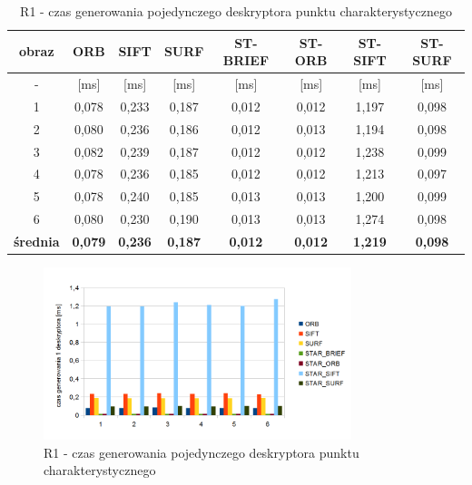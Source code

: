 \begin{table}[!htbp]
  \centering
  \caption{R1 - czas generowania pojedynczego deskryptora punktu charakterystycznego}
    \begin{tabular}{|c|c|c|c|c|c|c|c|}\hline

    obraz & \textbf{ORB} & \textbf{SIFT} & \textbf{SURF} & \textbf{ST-BRIEF} & \textbf{ST-ORB} & \textbf{ST-SIFT} & \textbf{ST-SURF} \\\hline

    - & [ms] & [ms] & [ms] & [ms] & [ms] & [ms] & [ms] \\\hline
    1 & 0,078 & 0,233 & 0,187 & 0,012 & 0,012 & 1,197 & 0,098 \\
    2 & 0,080 & 0,236 & 0,186 & 0,012 & 0,013 & 1,194 & 0,098 \\
    3 & 0,082 & 0,239 & 0,187 & 0,012 & 0,012 & 1,238 & 0,099 \\
    4 & 0,078 & 0,236 & 0,185 & 0,012 & 0,012 & 1,213 & 0,097 \\
    5 & 0,078 & 0,240 & 0,185 & 0,013 & 0,013 & 1,200 & 0,099 \\
    6 & 0,080 & 0,230 & 0,190 & 0,013 & 0,013 & 1,274 & 0,098 \\\hline
    \textbf{średnia} & \textbf{0,079} & \textbf{0,236} & \textbf{0,187} & \textbf{0,012} & \textbf{0,012} & \textbf{1,219} & \textbf{0,098} \\\hline
    

    \end{tabular}%
  \label{tab:r1_f3}%
\end{table}%


\begin{figure}[!htbp]
\centering
\includegraphics[width=0.8\textwidth]{pict/slowik/r1/f3.png}
\caption{R1 - czas generowania pojedynczego deskryptora punktu charakterystycznego}
\label{fig:r1_f3}
\end{figure}


